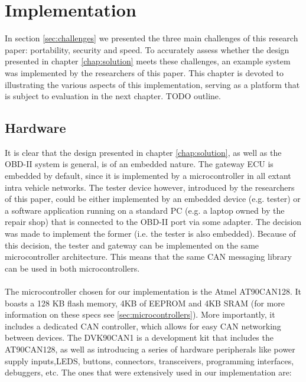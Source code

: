 
\chapter{Implementation}

In section \ref{sec:challenges} we presented the three main challenges of this research paper: portability, security and speed. To accurately assess whether the design presented in chapter \ref{chap:solution} meets these challenges, an example system was implemented by the researchers of this paper. This chapter is devoted to illustrating the various aspects of this implementation, serving as a platform that is subject to evaluation in the next chapter. TODO outline.

\section{Hardware}
\label{sec:hardware}
It is clear that the design presented in chapter \ref{chap:solution}, as well as the OBD-II system is general, is of an embedded nature. The gateway ECU is embedded by default, since it is implemented by a microcontroller in all extant intra vehicle networks. The tester device however, introduced by the researchers of this paper, could be either implemented by an embedded device (e.g. tester) or a software application running on a standard PC (e.g. a laptop owned by the repair shop) that is connected to the OBD-II port via some adapter. The decision was made to implement the former (i.e. the tester is also embedded). Because of this decision, the tester and gateway can be implemented on the same microcontroller architecture. This means that the same CAN messaging library can be used in both microcontrollers. \\ \\ The microcontroller chosen for our implementation is the Atmel AT90CAN128. It boasts a 128 KB flash memory, 4KB of EEPROM and 4KB SRAM (for more information on these specs see \ref{sec:microcontrollers}). More importantly, it includes a dedicated CAN controller, which allows for easy CAN networking between devices. The DVK90CAN1 is a development kit that includes the AT90CAN128, as well as introducing a series of hardware peripherals like power supply inputs,LEDS, buttons, connectors, transceivers, programming interfaces, debuggers, etc. The ones that were extensively used in our implementation are:
